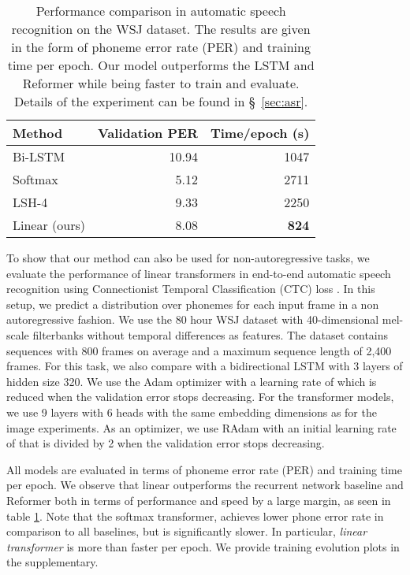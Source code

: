 \documentclass{article}
\newcommand{\linear}{\emph{linear transformer}}
\begin{document}
\bgroup
\renewcommand{\arraystretch}{1.1}
\begin{table}
    \begin{center}
    \begin{tabular}{lrr}
        Method & Validation PER & Time/epoch (s) \\
        \hline
        Bi-LSTM & 10.94 & 1047 \\
        \hline
        Softmax &  5.12 & 2711 \\
               LSH-4   &  9.33 & 2250 \\
        \hline
        Linear (ours) & 8.08 & \textbf{824}
    \end{tabular}
    \end{center}
    \caption{Performance comparison in automatic speech recognition on the WSJ
             dataset. The results are given in the form of phoneme error rate
             (PER) and training time per epoch. Our model outperforms the LSTM
             and Reformer while being faster to train and evaluate. Details of
             the experiment can be found in \S~\ref{sec:asr}.}
    \label{tab:asr}
    \vspace{-1em}
\end{table}
\egroup

To show that our method can also be used for non-autoregressive tasks, we
evaluate the performance of linear transformers in end-to-end automatic speech
recognition using Connectionist Temporal Classification (CTC) loss
\cite{graves2006connectionist}. In this setup, we predict a distribution over
phonemes for each input frame in a non autoregressive fashion. We use the 80
hour WSJ dataset \cite{paul1992design} with 40-dimensional mel-scale
filterbanks without temporal differences as features. The dataset contains
sequences with 800 frames on average and a maximum sequence length of 2,400
frames.
For this task, we also compare with a bidirectional LSTM
\cite{hochreiter1997long} with 3 layers of hidden size 320. We use the Adam
optimizer \cite{kingma2014adam} with a learning rate of  which is
reduced when the validation error stops decreasing. For the transformer models,
we use 9 layers with 6 heads with the same embedding dimensions as for the
image experiments. As an optimizer, we use RAdam with an initial learning rate
of  that is divided by 2 when the validation error stops decreasing.

All models are evaluated in terms of phoneme error rate (PER) and training time per
epoch. We observe that linear outperforms the recurrent network baseline and
Reformer both in terms of performance and speed by a large margin, as seen in
table \ref{tab:asr}. Note that the softmax transformer, achieves lower phone
error rate in comparison to all baselines, but is significantly slower. In
particular, \linear{} is more than  faster per epoch. We provide
training evolution plots in the supplementary.
\end{document}
